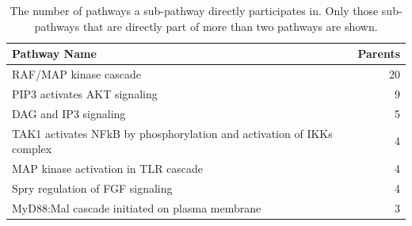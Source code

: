 \documentclass[10pt]{article}
\begin{document}
\begin{table}[H]
  \centering
  \caption{The number of pathways a sub-pathway directly participates in. Only those sub-pathways that are directly part of more than two pathways are shown.}
  \begin{tabular}{lr}
    \toprule
    Pathway Name&	Parents\\\midrule
    RAF/MAP kinase cascade&	20\\
    PIP3 activates AKT signaling&	9\\
    DAG and IP3 signaling&	5\\
    TAK1 activates NFkB by phosphorylation and activation of IKKs complex&	4\\
    MAP kinase activation in TLR cascade&	4\\
    Spry regulation of FGF signaling&	4\\
    MyD88:Mal cascade initiated on plasma membrane&	3\\
\bottomrule
  \end{tabular}
  \label{tab:st1}
\end{table}
\end{document}
